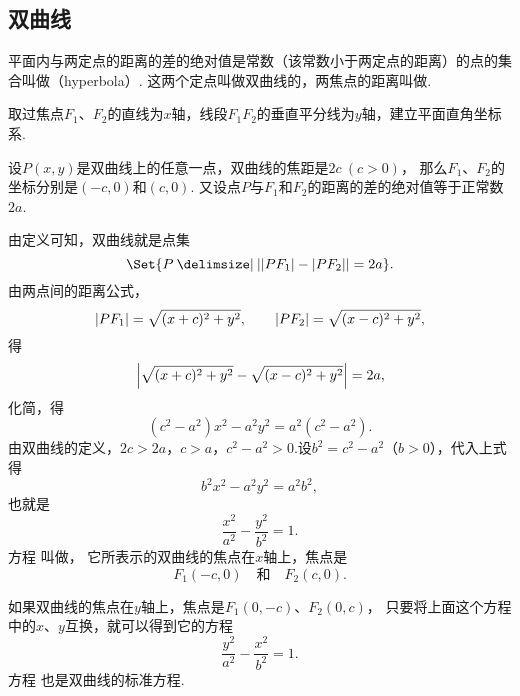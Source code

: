 \subsection{双曲线}
\begin{definition}
平面内与两定点的距离的差的绝对值是常数（该常数小于两定点的距离）的点的集合叫做（hyperbola）.
这两个定点叫做双曲线的，两焦点的距离叫做.
\end{definition}

取过焦点\(F_1\)、\(F_2\)的直线为\(x\)轴，线段\(F_1 F_2\)的垂直平分线为\(y\)轴，建立平面直角坐标系.

设\(P(x,y)\)是双曲线上的任意一点，双曲线的焦距是\(2c\ (c>0)\)，
那么\(F_1\)、\(F_2\)的坐标分别是\((-c,0)\)和\((c,0)\).
又设点\(P\)与\(F_1\)和\(F_2\)的距离的差的绝对值等于正常数\(2a\).

由定义可知，双曲线就是点集\[
\Set{ P \given \abs{\abs{P F_1} - \abs{P F_2}} = 2a }.
\]由两点间的距离公式，\[
\abs{P F_1} = \sqrt{(x+c)^2+y^2},
\qquad
\abs{P F_2} = \sqrt{(x-c)^2+y^2},
\]得\[
\abs{\sqrt{(x+c)^2+y^2} - \sqrt{(x-c)^2+y^2}} = 2a,
\]化简，得\[
(c^2-a^2)x^2 - a^2 y^2 = a^2(c^2-a^2).
\]由双曲线的定义，\(2c > 2a\)，\(c > a\)，\(c^2 - a^2 > 0\).设\(b^2 = c^2 - a^2\)（\(b > 0\)），代入上式得\[
b^2 x^2 - a^2 y^2 = a^2 b^2,
\]也就是\begin{equation}\label{equation:解析几何.双曲线的标准方程1}
	\frac{x^2}{a^2} - \frac{y^2}{b^2} = 1.
\end{equation}
方程  叫做，
它所表示的双曲线的焦点在\(x\)轴上，焦点是\[
	F_1(-c,0)
	\quad\text{和}\quad
	F_2(c,0).
\]

如果双曲线的焦点在\(y\)轴上，焦点是\(F_1(0,-c)\)、\(F_2(0,c)\)，
只要将上面这个方程中的\(x\)、\(y\)互换，就可以得到它的方程\begin{equation}\label{equation:解析几何.双曲线的标准方程2}
	\frac{y^2}{a^2}-\frac{x^2}{b^2}=1.
\end{equation}
方程  也是双曲线的标准方程.

